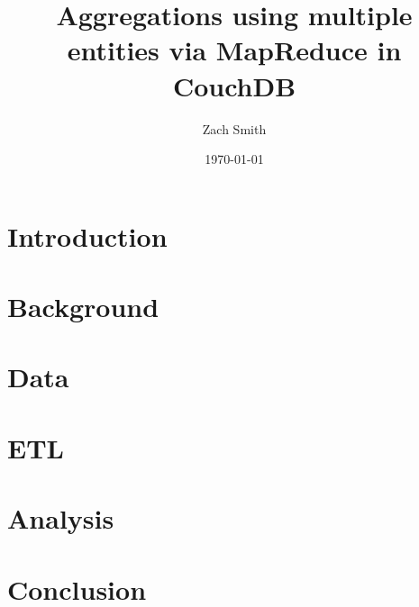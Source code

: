 \documentclass[
    parskip=full,
    a4paper
]{report}
\title{Aggregations using multiple entities via MapReduce in CouchDB}
\author{Zach Smith}
\date{\today}
\begin{document}
\maketitle
\thispagestyle{empty}

\begin{abstract}
    
\end{abstract}
\newpage

\tableofcontents
\newpage

\chapter{Introduction}


\chapter{Background}





\chapter{Data}






\chapter{ETL}







\chapter{Analysis}






\chapter{Conclusion}




\newpage
\end{document}
